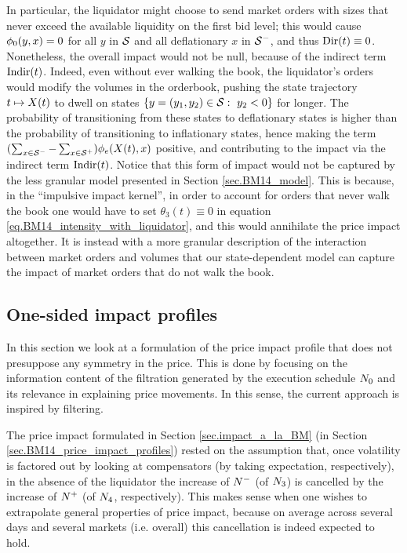 \documentclass[10pt, article,table]{article}
\begin{document}
 In particular, the liquidator might choose to send market orders with sizes that never exceed the available liquidity on the first bid level; this would cause $\transProb_0(y,x)=0$ for all $y$ in $\stateSpace$ and all deflationary $x$ in $\deflationarySpace$, and thus $\directImpact(t)\equiv 0$. Nonetheless, the overall impact would not be null, because of the indirect term $\indirectImpact(t)$. Indeed, even without ever walking the book, the liquidator's orders would modify the volumes in the orderbook, pushing the state trajectory $t\mapsto \stateVariable(t)$ to dwell on states $\lbrace y=(y_1,y_2)\in\stateSpace: \, \, y_2<0\rbrace$ for longer. The probability of transitioning from these states to deflationary states is higher than the probability of transitioning to inflationary states, hence making the term $(\sum_{x\in\deflationarySpace} - \sum_{x\in\inflationarySpace})\transProb_{e}(\stateVariable(t), x)$ positive, and contributing to the impact via the indirect term $\indirectImpact(t)$.
 Notice that this form of impact would not be captured by the less granular model presented in Section \ref{sec.BM14_model}. This is because, in the ``impulsive impact kernel'', in order to account for orders that never walk the book one would have to set $\theta_3(t)\equiv0$ in equation \eqref{eq.BM14_intensity_with_liquidator}, and this would annihilate the price impact altogether.  It is instead with a more granular description of the interaction between market orders and volumes that our state-dependent model can capture the impact of market orders that do not walk the book.   

\subsection{One-sided impact profiles}\label{sec.one-side_impact}
In this section we look at a formulation of the price impact profile that does not presuppose any symmetry in the price. This is done by focusing on the information content of the filtration generated by the execution schedule $\countingProc[0]$ and its relevance in explaining price movements. In this sense, the current approach is inspired by filtering. 

The price impact formulated in Section \ref{sec.impact_a_la_BM} (in Section \ref{sec.BM14_price_impact_profiles}) rested on the assumption that, once volatility is factored out by looking at compensators (by taking expectation, respectively), in the absence of the liquidator the increase of $\Nminus$ (of $\countingProc[3]$) is cancelled by the increase of $\Nplus$ (of $\countingProc[4]$, respectively). This makes sense when one wishes to extrapolate general properties of price impact, because on average across several days and several markets (i.e. overall) this cancellation is indeed expected to hold.
\end{document}
